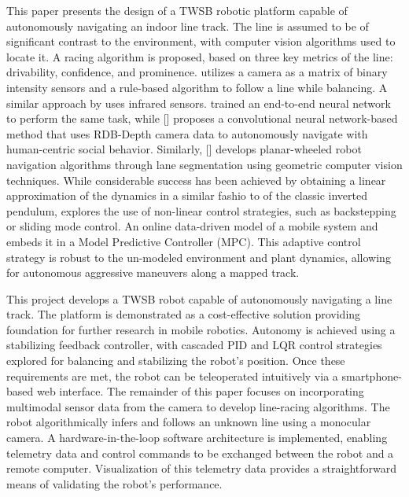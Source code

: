     This paper presents the design of a TWSB robotic platform capable of autonomously navigating an 
    indoor line track. The line is assumed to be of significant contrast to the environment, with computer 
    vision algorithms used to locate it. A racing algorithm is proposed,
    based on three key metrics of the line: drivability, confidence, and prominence.
    \cite{visionlinetwsb} utilizes a camera as a matrix of binary intensity sensors and a rule-based 
    algorithm to follow a line while balancing. A similar approach by \cite{ghani2011two} uses infrared sensors. 
    \cite{nntwsbvision} trained an end-to-end neural network to perform the same task, while [] proposes a 
    convolutional neural network-based method that uses RDB-Depth camera data to autonomously 
    navigate with human-centric social behavior. Similarly, [] develops planar-wheeled robot navigation 
    algorithms through lane segmentation using geometric computer vision techniques.
    While considerable success has been achieved by obtaining a linear approximation of the dynamics in a similar fashio to 
    of the classic inverted pendulum, \cite{AdvancedWIP} explores the use of non-linear control strategies, such as backstepping or 
    sliding mode control. An online data-driven model of a mobile system and embeds it 
    in a Model Predictive Controller (MPC). This adaptive control strategy is robust to the un-modeled 
    environment and plant dynamics, allowing for autonomous aggressive maneuvers along a mapped track.
    
    This project develops a TWSB robot capable of autonomously navigating a line track.
    The platform is demonstrated as a cost-effective solution providing foundation for further research in mobile robotics.
    Autonomy is achieved using a stabilizing feedback controller, with cascaded PID and 
    LQR control strategies explored for balancing and stabilizing the robot's position. 
    Once these requirements are met, the robot can be teleoperated intuitively via a 
    smartphone-based web interface. The remainder of this paper focuses on incorporating 
    multimodal sensor data from the camera to develop line-racing algorithms.
    The robot algorithmically infers and follows an unknown line using a monocular camera. 
    A hardware-in-the-loop software architecture is implemented, enabling telemetry data and control 
    commands to be exchanged between the robot and a remote computer. Visualization of this telemetry
    data provides a straightforward means of validating the robot's performance.
    \pagebreak{}

